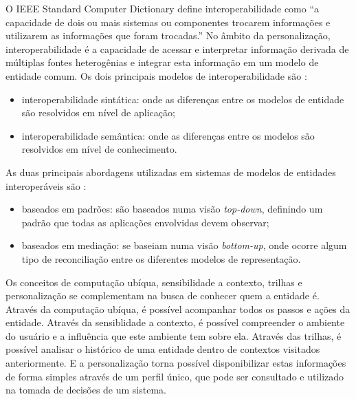 O IEEE Standard Computer Dictionary \cite{ieeedict} define interoperabilidade como ``a capacidade de dois ou mais sistemas ou componentes trocarem informações e utilizarem as informações que foram trocadas.'' No âmbito da personalização, interoperabilidade é a capacidade de acessar e interpretar informação derivada de múltiplas fontes heterogênias e integrar esta informação em um modelo de entidade comum. Os dois principais modelos de interoperabilidade são \cite{carmagnola09}: 

\begin{itemize}

  \item interoperabilidade sintática: onde as diferenças entre os modelos de entidade são resolvidos em nível de aplicação;
  \item interoperabilidade semântica: onde as diferenças entre os modelos são resolvidos em nível de conhecimento.

\end{itemize}

As duas principais abordagens utilizadas em sistemas de modelos de entidades interoperáveis são \cite{viviani10}:

\begin{itemize}

  \item baseados em padrões: são baseados numa visão \emph{top-down}, definindo um padrão que todas as aplicações envolvidas devem observar;
  \item baseados em mediação: se baseiam numa visão \emph{bottom-up}, onde ocorre algum tipo de reconciliação entre os diferentes modelos de representação.

\end{itemize}

Os conceitos de computação ubíqua, sensibilidade a contexto, trilhas e personalização se complementam na busca de conhecer quem a entidade é. Através da computação ubíqua, é possível acompanhar todos os passos e ações da entidade. Através da sensiblidade a contexto, é possível compreender o ambiente do usuário e a influência que este ambiente tem sobre ela. Através das trilhas, é possível analisar o histórico de uma entidade dentro de contextos visitados anteriormente. E a personalização torna possível disponibilizar estas informações de forma simples através de um perfil único, que pode ser consultado e utilizado na tomada de decisões de um sistema.
